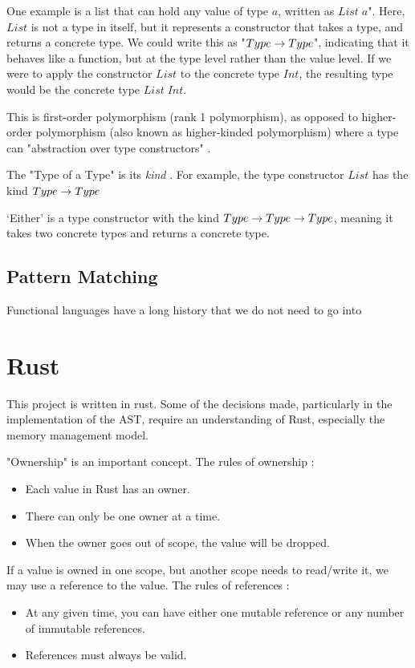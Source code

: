 One example is a list that can hold any value of type $a$, written as \(List\;a\)". Here, \(List\) is not a type in itself, but it represents a constructor that takes a type, and returns a concrete type. We could write this as "$Type \rightarrow Type$", indicating that it behaves like a function, but at the type level rather than the value level. If we were to apply the constructor \(List\) to the concrete type \(Int\), the resulting type would be the concrete type \(List \;Int\). 

This is first-order polymorphism (rank 1 polymorphism), as opposed to higher-order polymorphism (also known as higher-kinded polymorphism) where a type can "abstraction over type constructors" \cite{yallop2014lightweightpoly}. 

The "Type of a Type" is its \emph{kind} \cite{pierce2002types}. For example, the type constructor $List$ has the kind $Type \rightarrow Type$ 

`Either' is a type constructor with the kind $Type \rightarrow Type \rightarrow Type$, meaning it takes two concrete types and returns a concrete type. 
\subsection{Pattern Matching}


Functional languages have a long history that we do not need to go into

\section{Rust}
\label{bg:rust}
This project is written in rust. Some of the decisions made, particularly in the implementation of the AST, require an understanding of Rust, especially the memory management model.

"Ownership" is an important concept. The rules of ownership \cite{rust_book}:
\begin{itemize}
    \item Each value in Rust has an owner.
    \item There can only be one owner at a time.
    \item When the owner goes out of scope, the value will be dropped.
\end{itemize}   

If a value is owned in one scope, but another scope needs to read/write it, we may use a reference to the value. The rules of references \cite{rust_book}:
\begin{itemize}
    \item At any given time, you can have either one mutable reference or any number of immutable references. 
    \item References must always be valid.
\end{itemize}

